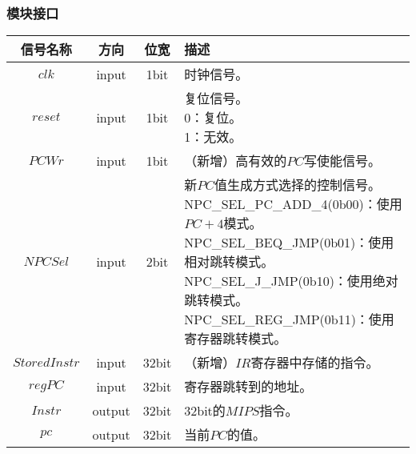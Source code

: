 \documentclass[main.tex]{subfiles}
\begin{document}
\subsubsection{模块接口}
\begin{center}
    \begin{tabular}[]{c c c l}
        \toprule
        信号名称 & 方向 & 位宽 & 描述 \\
        \midrule
        $clk$ & input & 1bit & 时钟信号。\\
        $reset$ & input & 1bit & \makecell[lt]{
            复位信号。\\
             0：复位。\\
             1：无效。
        } \\
        $PCWr$ & input & 1bit & （新增）高有效的$PC$写使能信号。\\
        $NPCSel$ & input & 2bit & \makecell[lt]{
            新$PC$值生成方式选择的控制信号。\\
            NPC\_SEL\_PC\_ADD\_4(0b00)：使用$PC+4$模式。\\
            NPC\_SEL\_BEQ\_JMP(0b01)：使用相对跳转模式。\\
            NPC\_SEL\_J\_JMP(0b10)：使用绝对跳转模式。\\
            NPC\_SEL\_REG\_JMP(0b11)：使用寄存器跳转模式。
        } \\
        \midrule
        $StoredInstr$ & input & 32bit & （新增）$IR$寄存器中存储的指令。 \\
        $regPC$ & input & 32bit & 寄存器跳转到的地址。\\
        $Instr$ & output & 32bit & 32bit的$MIPS$指令。\\
        $pc$ & output & 32bit & 当前$PC$的值。 \\
        \bottomrule
    \end{tabular}
\end{center}

\clearpage
\end{document}
